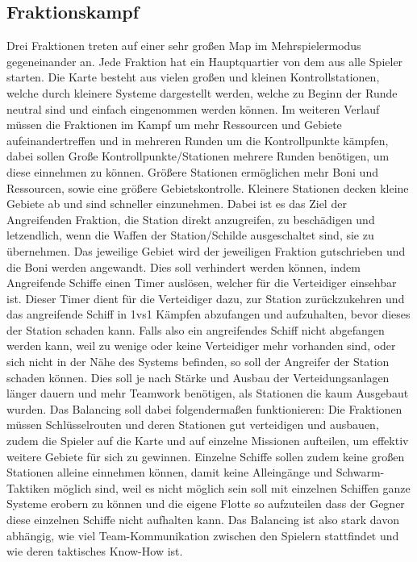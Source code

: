 \documentclass[fontsize=12pt,paper=a4,twoside]{scrartcl}
\begin{document}
\subsection{Fraktionskampf}
Drei Fraktionen treten auf einer sehr großen Map im Mehrspielermodus gegeneinander an. Jede Fraktion hat ein Hauptquartier von dem aus alle Spieler starten. Die Karte besteht aus vielen großen und kleinen Kontrollstationen, welche durch kleinere Systeme dargestellt werden, welche zu Beginn der Runde neutral sind und einfach eingenommen werden können. 
Im weiteren Verlauf müssen die Fraktionen im Kampf um mehr Ressourcen und Gebiete aufeinandertreffen und in mehreren Runden um die Kontrollpunkte kämpfen, dabei sollen Große Kontrollpunkte/Stationen mehrere Runden benötigen, um diese einnehmen zu können. Größere Stationen ermöglichen mehr Boni und Ressourcen, sowie eine größere Gebietskontrolle. Kleinere Stationen decken kleine Gebiete ab und sind schneller einzunehmen. Dabei ist es das Ziel der Angreifenden Fraktion, die Station direkt anzugreifen, zu beschädigen und letzendlich, wenn die Waffen der Station/Schilde ausgeschaltet sind, sie zu übernehmen. Das jeweilige Gebiet wird der jeweiligen Fraktion gutschrieben und die Boni werden angewandt. 
Dies soll verhindert werden können, indem Angreifende Schiffe einen Timer auslösen, welcher für die Verteidiger einsehbar ist. Dieser Timer dient für die Verteidiger dazu, zur Station zurückzukehren und das angreifende Schiff in 1vs1 Kämpfen abzufangen und aufzuhalten, bevor dieses der Station schaden kann.
 Falls also ein angreifendes Schiff nicht abgefangen werden kann, weil zu wenige oder keine Verteidiger mehr vorhanden sind, oder sich nicht in der Nähe des Systems befinden, so soll der Angreifer der Station schaden können. Dies soll je nach Stärke und Ausbau der Verteidungsanlagen länger dauern und mehr Teamwork benötigen, als Stationen die kaum Ausgebaut wurden.
 Das Balancing soll dabei folgendermaßen funktionieren: Die Fraktionen müssen Schlüsselrouten und deren Stationen gut verteidigen und ausbauen, zudem die Spieler auf die Karte und auf einzelne \glqq Missionen\grqq{} aufteilen, um effektiv weitere Gebiete für sich zu gewinnen. Einzelne Schiffe sollen zudem keine großen Stationen alleine einnehmen können, damit keine Alleingänge und \glqq Schwarm-Taktiken\grqq{} möglich sind, weil es nicht möglich sein soll mit einzelnen Schiffen ganze Systeme erobern zu können und die eigene Flotte so aufzuteilen dass der Gegner diese einzelnen Schiffe nicht aufhalten kann. 
 Das Balancing ist also stark davon abhängig, wie viel Team-Kommunikation zwischen den Spielern stattfindet und wie deren taktisches Know-How ist. 
\end{document}
